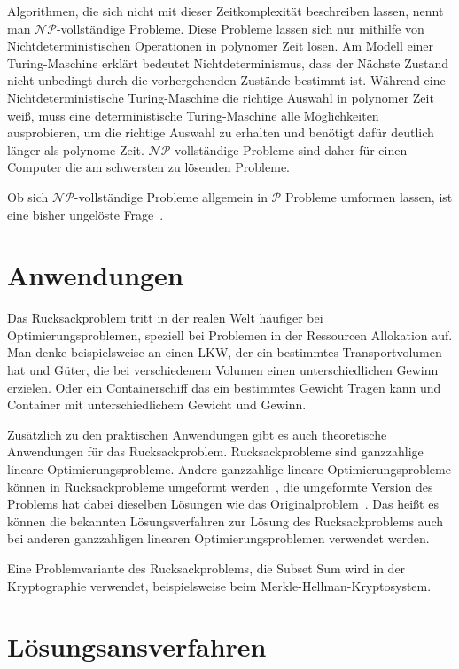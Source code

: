 \documentclass[12pt, a4paper, ngerman]{article}
\begin{document}
Algorithmen, die sich nicht mit dieser Zeitkomplexität beschreiben lassen,
nennt man \(\mathcal{NP}\)-vollständige Probleme.
Diese Probleme lassen sich nur mithilfe von Nichtdeterministischen Operationen
in polynomer Zeit lösen.
Am Modell einer Turing-Maschine erklärt bedeutet Nichtdeterminismus,
dass der Nächste Zustand nicht unbedingt durch die vorhergehenden Zustände bestimmt ist.
Während eine Nichtdeterministische Turing-Maschine die richtige Auswahl in polynomer Zeit weiß,
muss eine deterministische Turing-Maschine alle Möglichkeiten ausprobieren, um die richtige Auswahl zu erhalten
und benötigt dafür deutlich länger als polynome Zeit.
\(\mathcal{NP}\)-vollständige Probleme sind daher für einen Computer
die am schwersten zu lösenden Probleme.

Ob sich \(\mathcal{NP}\)-vollständige Probleme allgemein in \(\mathcal{P}\) Probleme umformen lassen,
ist eine bisher ungelöste Frage~\cite[Kap. 15]{KombinatorischeOptimierung}.

\section{Anwendungen}

Das Rucksackproblem tritt in der realen Welt häufiger bei Optimierungsproblemen,
speziell bei Problemen in der Ressourcen Allokation auf.
Man denke beispielsweise an einen LKW, der ein bestimmtes Transportvolumen hat und Güter,
die bei verschiedenem Volumen einen unterschiedlichen Gewinn erzielen.
Oder ein Containerschiff das ein bestimmtes Gewicht Tragen kann
und Container mit unterschiedlichem Gewicht und Gewinn.

Zusätzlich zu den praktischen Anwendungen gibt es auch theoretische Anwendungen für das Rucksackproblem.
Rucksackprobleme sind ganzzahlige lineare Optimierungsprobleme.
Andere ganzzahlige lineare Optimierungsprobleme können in Rucksackprobleme umgeformt werden~\cite{mainKnapsack},
die umgeformte Version des Problems hat dabei dieselben Lösungen wie das Originalproblem~\cite{mainKnapsack}.
Das heißt es können die bekannten Lösungsverfahren zur Lösung des Rucksackproblems
auch bei anderen ganzzahligen linearen Optimierungsproblemen verwendet werden.

Eine Problemvariante des Rucksackproblems, die Subset Sum wird in der Kryptographie verwendet,
beispielsweise beim Merkle-Hellman-Kryptosystem.

\section{Lösungsansverfahren}
\end{document}
